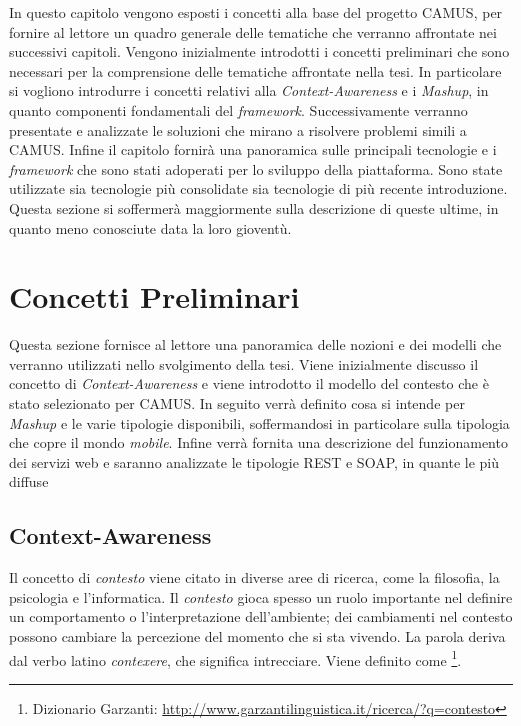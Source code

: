 In questo capitolo vengono esposti i concetti alla base del progetto CAMUS, per fornire al lettore un quadro generale delle tematiche che verranno affrontate nei successivi capitoli. Vengono inizialmente introdotti i concetti preliminari che sono necessari per la comprensione delle tematiche affrontate nella tesi. In particolare si vogliono introdurre i concetti relativi alla \emph{Context-Awareness} e i \emph{Mashup}, in quanto componenti fondamentali del \emph{framework}. Successivamente verranno presentate e analizzate le soluzioni che mirano a risolvere problemi simili a CAMUS. Infine il capitolo fornirà una panoramica sulle principali tecnologie e i \emph{framework} che sono stati adoperati per lo sviluppo della piattaforma. Sono state utilizzate sia tecnologie più consolidate sia tecnologie di più recente introduzione. Questa sezione si soffermerà maggiormente sulla descrizione di queste ultime, in quanto meno conosciute data la loro gioventù.

\section{Concetti Preliminari\label{sec:concetti-preliminari}}

Questa sezione fornisce al lettore una panoramica delle nozioni e dei modelli che verranno utilizzati nello svolgimento della tesi. Viene inizialmente discusso il concetto di \emph{Context-Awareness} e viene introdotto il modello del contesto che è stato selezionato per CAMUS. In seguito verrà definito cosa si intende per \emph{Mashup} e le varie tipologie disponibili, soffermandosi in particolare sulla tipologia che copre il mondo \emph{mobile}. Infine verrà fornita una descrizione del funzionamento dei servizi web e saranno analizzate le tipologie REST e SOAP, in quante le più diffuse

\subsection{Context-Awareness\label{sec:context-awareness}}

Il concetto di \emph{contesto} viene citato in diverse aree di ricerca, come la filosofia, la psicologia e l'informatica. Il \emph{contesto} gioca spesso un ruolo importante nel definire un comportamento o l'interpretazione dell'ambiente; dei cambiamenti nel contesto possono cambiare la percezione del momento che si sta vivendo. La parola  deriva dal verbo latino \emph{contexere}, che significa intrecciare. Viene definito come \footnote{Dizionario Garzanti: \url{http://www.garzantilinguistica.it/ricerca/?q=contesto}}.

